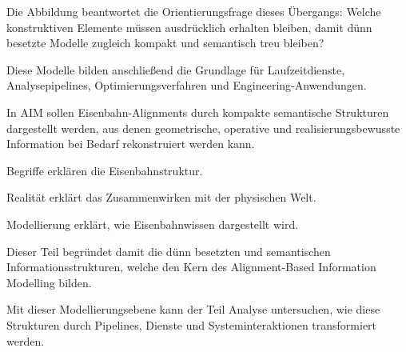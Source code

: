 Die Abbildung beantwortet die Orientierungsfrage dieses Übergangs: Welche
konstruktiven Elemente müssen ausdrücklich erhalten bleiben, damit dünn
besetzte Modelle zugleich kompakt und semantisch treu bleiben?

Diese Modelle bilden anschließend die Grundlage für Laufzeitdienste,
Analysepipelines, Optimierungsverfahren und Engineering-Anwendungen.

\begin{principle}
\label{princ:sparse-modeling}
In AIM sollen Eisenbahn-Alignments durch kompakte semantische Strukturen
dargestellt werden, aus denen geometrische, operative und
realisierungsbewusste Information bei Bedarf rekonstruiert werden kann.
\end{principle}

\begin{summary}
Begriffe erklären die Eisenbahnstruktur.

Realität erklärt das Zusammenwirken mit der physischen Welt.

Modellierung erklärt, wie Eisenbahnwissen dargestellt wird.

Dieser Teil begründet damit die dünn besetzten und semantischen
Informationsstrukturen, welche den Kern des Alignment-Based Information
Modelling bilden.
\end{summary}

Mit dieser Modellierungsebene kann der Teil Analyse untersuchen, wie diese
Strukturen durch Pipelines, Dienste und Systeminteraktionen transformiert
werden.
